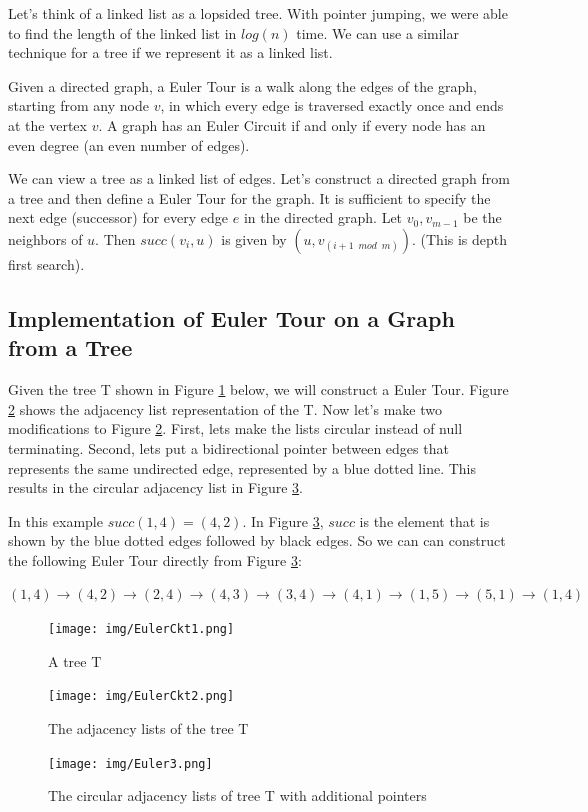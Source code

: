 \documentclass[twoside]{article}
\begin{document}
Let's think of a linked list as a lopsided tree.  With pointer jumping, we were able to find the length of the linked list in $log(n)$ time.  We can use a similar technique for a tree if we represent it as a linked list.

Given a directed graph, a Euler Tour is a walk along the edges of the graph, starting from any node $v$, in which every edge is traversed exactly once and ends at the vertex $v$.  A graph has an Euler Circuit if and only if every node has an even degree (an even number of edges).

We can view a tree as a linked list of edges.  Let's construct a directed graph from a tree and then define a Euler Tour for the graph.  It is sufficient to specify  the next edge (successor) for every edge $e$ in the directed graph.  Let $v_0 , v_{m-1}$ be the neighbors of $u$.  Then $succ(v_i, u)$ is given by $(u, v_{(i+1\enspace mod\enspace m)})$.  (This is depth first search).

\subsection{Implementation of Euler Tour on a Graph from a Tree} 

Given the tree T shown in Figure \ref{fig:euler1} below, we will construct a Euler Tour.  Figure \ref{fig:euler2} shows the adjacency list representation of the T.  Now let's make two modifications to Figure \ref{fig:euler2}.  First, lets make the lists circular instead of null terminating.  Second, lets put a bidirectional pointer between edges that represents the same undirected edge, represented by a blue dotted line.  This results in the circular adjacency list in Figure \ref{fig:euler3}. 

In this example $succ(1,4) = (4,2)$.  In Figure \ref{fig:euler3}, $succ$ is the element that is shown by the blue dotted edges followed by black edges.  So we can can construct the following Euler Tour directly from Figure \ref{fig:euler3}:

$(1, 4) \rightarrow (4, 2) \rightarrow (2, 4) \rightarrow (4, 3) \rightarrow (3, 4) \rightarrow (4, 1) \rightarrow (1, 5) \rightarrow (5, 1) \rightarrow (1, 4)$

\begin{figure}[!ht]
\centering
\texttt{[image: img/EulerCkt1.png]}
\caption{A tree T} \label{fig:euler1} 
\end{figure}

\begin{figure}[!ht]
\centering
\texttt{[image: img/EulerCkt2.png]}
\caption{The adjacency lists of the tree T} \label{fig:euler2} 
\end{figure}

\begin{figure}[!ht]
\centering
\texttt{[image: img/Euler3.png]}
\caption{The circular adjacency lists of tree T with additional pointers} \label{fig:euler3} 
\end{figure}
\end{document}
